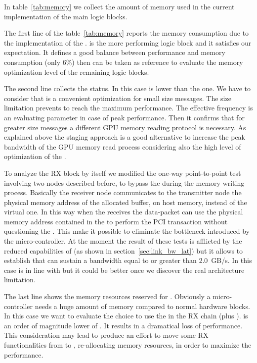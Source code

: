 In table~\ref{tab:memory} we collect the amount of memory used in the
current implementation of the main logic blocks.


The first line of the table~\ref{tab:memory} reports the memory
consumption due to the implementation of the .   is the more performing logic block and it satisfies our
expectation. It defines a good balance between performance and memory
consumption (only 6\%) then  can be taken as reference to
evaluate the memory optimization level of the remaining logic blocks.


The second line collects the  status. In this case
 is lower than the  one.
We have to consider that \PtoP is a convenient optimization for small
size messages. The size limitation prevents to reach the maximum
performance. The effective frequency is an evaluating parameter in
case of peak performance. Then it confirms that for greater size
messages a different GPU memory reading protocol is necessary.
As explained above the staging approach is a good alternative to
increase the peak bandwidth of the GPU memory read process considering
also the high level of optimization of the .


To analyze the RX block by itself we modified the one-way
point-to-point test involving two nodes described before, to bypass
the \nios during the memory writing process.
Basically the receiver node communicates to the transmitter node the
physical memory address of the allocated buffer, on host memory,
instead of the virtual one. In this way when the 
receives the data-packet can use the physical memory address contained
in the \header to perform the PCI transaction without questioning the
\nios. This make it possible to eliminate the bottleneck introduced by
the \mbox{micro-controller}.
At the moment the result of these tests is afflicted by the reduced
capabilities of  (as shown in
section~\ref{sec:link_bw_lat}) but it allows to establish that  can sustain a bandwidth equal to or greater than 2.0~GB/s. In
this case  is in line with  but it could be better
once we discover the real architecture limitation.


The last line shows the memory resources reserved for \nios.
Obviously a \mbox{micro-controller} needs a huge amount of memory
compared to normal hardware blocks. In this case we want to evaluate
the choice to use the \nios in the RX chain (\nios plus ).   is an order of magnitude lower of . It
results in a dramatical loss of performance. This consideration may
lead to produce an effort to move some RX functionalities from \nios
to , re-allocating memory resources, in order to maximize
the performance.


